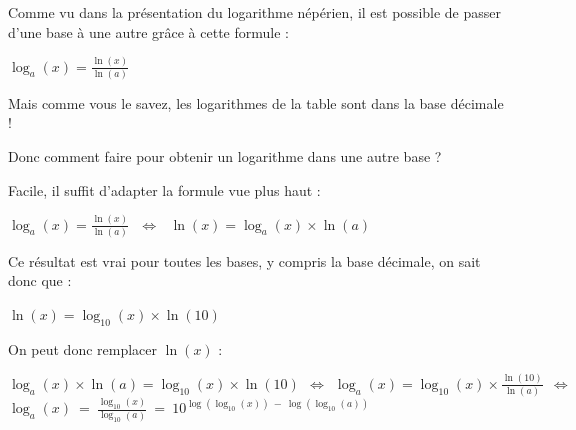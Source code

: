 \documentclass[a4paper]{article}
\begin{document}
Comme vu dans la présentation du logarithme népérien, il est possible de passer d'une base à une autre grâce à cette formule : 
\begin{center}
\begin{LARGE}

	$ \log_a (x) = \frac{\ln (x)}{\ln (a)}$ 
	
\end{LARGE}
\end{center}

\begin{center}
Mais comme vous le savez, les logarithmes de la table sont dans la base décimale !

Donc comment faire pour obtenir un logarithme dans une autre base ?
\end{center}

Facile, il suffit d'adapter la formule vue plus haut :

\vspace{0.1cm}

\begin{large}
\begin{center}
	 $ \log_a (x) = \frac{\ln (x)}{\ln (a)} ~~~ \Longleftrightarrow ~~~ \ln (x) = \log_a (x) \times \ln (a)$\\ 

\end{center}
\end{large}

Ce résultat est vrai pour toutes les bases, y compris la base décimale, on sait donc que :

\vspace{0.1cm}

\begin{large}
\begin{center}

	$ \ln (x) = \log_{10} (x) \times \ln (10)$\\ 
	
\end{center}
\end{large}

On peut donc remplacer $\ln (x)$ :

\begin{LARGE}
\begin{center}

	{\large $ \log_a (x) \times \ln (a) = \log_{10} (x) \times \ln (10) ~~ \Longleftrightarrow ~~ \log_a (x) = \log_{10} (x) \times \frac{\ln(10)}{\ln(a)} ~~ \Longleftrightarrow $ }\\
	\vspace{0.2cm}
	$\log_a (x) ~ = ~ \frac{\log_{10} (x)}{\log_{10} (a)} ~ = ~ 10^{\log(\log_{10} (x))~-~\log(\log_{10} (a))}$\\ 
	
\end{center}
\end{LARGE} 
\end{document}
